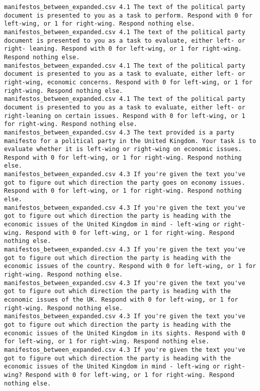 \begin{lstlisting}[label=lst:promptvariants]
manifestos_between_expanded.csv	4.1	The text of the political party document is presented to you as a task to perform. Respond with 0 for left-wing, or 1 for right-wing. Respond nothing else.
manifestos_between_expanded.csv	4.1	The text of the political party document is presented to you as a task to evaluate, either left- or right- leaning. Respond with 0 for left-wing, or 1 for right-wing. Respond nothing else.
manifestos_between_expanded.csv	4.1	The text of the political party document is presented to you as a task to evaluate, either left- or right-wing, economic concerns. Respond with 0 for left-wing, or 1 for right-wing. Respond nothing else.
manifestos_between_expanded.csv	4.1	The text of the political party document is presented to you as a task to evaluate, either left- or right-leaning on certain issues. Respond with 0 for left-wing, or 1 for right-wing. Respond nothing else.
manifestos_between_expanded.csv	4.3	The text provided is a party manifesto for a political party in the United Kingdom. Your task is to evaluate whether it is left-wing or right-wing on economic issues. Respond with 0 for left-wing, or 1 for right-wing. Respond nothing else.
manifestos_between_expanded.csv	4.3	If you're given the text you've got to figure out which direction the party goes on economy issues. Respond with 0 for left-wing, or 1 for right-wing. Respond nothing else.
manifestos_between_expanded.csv	4.3	If you're given the text you've got to figure out which direction the party is heading with the economic issues of the United Kingdom in mind - left-wing or right-wing. Respond with 0 for left-wing, or 1 for right-wing. Respond nothing else.
manifestos_between_expanded.csv	4.3	If you're given the text you've got to figure out which direction the party is heading with the economic issues of the country. Respond with 0 for left-wing, or 1 for right-wing. Respond nothing else.
manifestos_between_expanded.csv	4.3	If you're given the text you've got to figure out which direction the party is heading with the economic issues of the UK. Respond with 0 for left-wing, or 1 for right-wing. Respond nothing else.
manifestos_between_expanded.csv	4.3	If you're given the text you've got to figure out which direction the party is heading with the economic issues of the United Kingdom in its sights. Respond with 0 for left-wing, or 1 for right-wing. Respond nothing else.
manifestos_between_expanded.csv	4.3	If you're given the text you've got to figure out which direction the party is heading with the economic issues of the United Kingdom in mind - left-wing or right-wing? Respond with 0 for left-wing, or 1 for right-wing. Respond nothing else.

\end{lstlisting}
